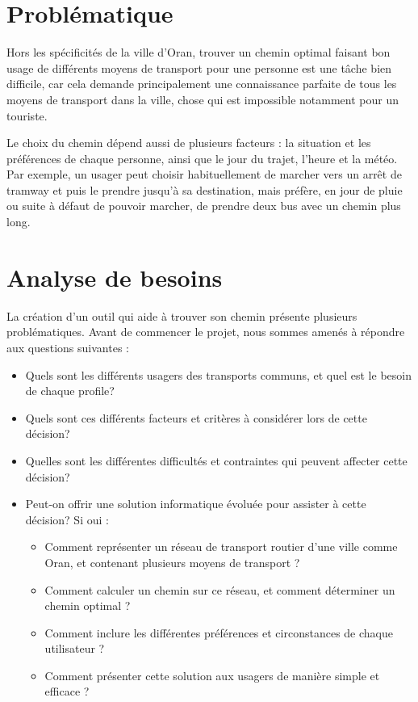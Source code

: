 \renewcommand\labelitemi{$\bullet$}
\section{Problématique}
Hors les spécificités de la ville d'Oran, trouver un chemin optimal faisant bon usage de différents moyens de transport pour une personne est une tâche bien difficile, car cela demande principalement une connaissance parfaite de tous les moyens de transport dans la ville, chose qui est impossible notamment pour un touriste.\newline

Le choix du chemin dépend aussi de plusieurs facteurs : la situation et les préférences de chaque personne, ainsi que le jour du trajet, l'heure et la météo. Par exemple, un usager peut choisir habituellement de marcher vers un arrêt de tramway et puis le prendre jusqu'à sa destination, mais préfère, en jour de pluie ou suite à défaut de pouvoir marcher, de prendre deux bus avec un chemin plus long.

\section{Analyse de besoins}
La création d'un outil qui aide à trouver son chemin présente plusieurs problématiques. Avant de commencer le projet, nous sommes amenés à répondre aux questions suivantes :
\begin{itemize}
	\item Quels sont les différents usagers des transports communs, et quel est le besoin de chaque profile?
	\item Quels sont ces différents facteurs et critères à considérer lors de cette décision?
	\item Quelles sont les différentes difficultés et contraintes qui peuvent affecter cette décision?
	\item Peut-on offrir une solution informatique évoluée pour assister à cette décision? Si oui : 
	      \begin{itemize}
	      	\item Comment représenter un réseau de transport routier d'une ville comme Oran, et contenant plusieurs moyens de transport ?
	      	\item Comment calculer un chemin sur ce réseau, et comment déterminer un chemin optimal ?
	      	\item Comment inclure les différentes préférences et circonstances de chaque utilisateur ?
	      	\item Comment présenter cette solution aux usagers de manière simple et efficace ?
	      \end{itemize}
\end{itemize}

